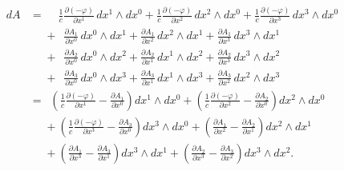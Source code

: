 \begin{align*}
	dA &= \phantom{+}
	\frac{1}{c} \frac{\partial (-\varphi)}{\partial x^1} \,dx^1 \wedge dx^0
	+ \frac{1}{c}\frac{\partial (-\varphi)}{\partial x^2} \,dx^2 \wedge dx^0
	+ \frac{1}{c}\frac{\partial (-\varphi)}{\partial x^3} \,dx^3 \wedge dx^0
	\\
	&\phantom{=}+ \phantom{\frac{1}{c}} \frac{\partial A_1}{\partial x^0} \,dx^0 \wedge dx^1
	+ \frac{\partial A_1}{\partial x^2} \,dx^2 \wedge dx^1
	+ \frac{\partial A_1}{\partial x^3} \,dx^3 \wedge dx^1
	\\
	&\phantom{=}+ \phantom{\frac{1}{c}} \frac{\partial A_2}{\partial x^0} \,dx^0 \wedge dx^2
	+ \frac{\partial A_2}{\partial x^1} \,dx^1 \wedge dx^2
	+ \frac{\partial A_2}{\partial x^3} \,dx^3 \wedge dx^2
	\\
	&\phantom{=}+ \phantom{\frac{1}{c}} \frac{\partial A_3}{\partial x^0} \,dx^0 \wedge dx^3
	+ \frac{\partial A_3}{\partial x^1} \,dx^1 \wedge dx^3
	+ \frac{\partial A_3}{\partial x^2} \,dx^2 \wedge dx^3
	\\[2ex] 
	&=
	\,\,\, \left(\frac{1}{c}\frac{\partial (-\varphi)}{\partial x^1}-\frac{\partial A_1}{\partial x^0}\right) dx^1 \wedge dx^0 
	+ \left(\frac{1}{c}\frac{\partial (-\varphi)}{\partial x^2}-\frac{\partial A_2}{\partial x^0}\right) dx^2 \wedge dx^0
	\\
	&\phantom{=} + \left(\frac{1}{c}\frac{\partial (-\varphi)}{\partial x^3}-\frac{\partial A_3}{\partial x^0}\right) dx^3 \wedge dx^0
	+ \left(\frac{\partial A_1}{\partial x^2}-\frac{\partial A_2}{\partial x^1}\right) dx^2 \wedge dx^1
	\\
	&\phantom{=} + \left(\frac{\partial A_1}{\partial x^3}-\frac{\partial A_3}{\partial x^1}\right) dx^3 \wedge dx^1 
	+ \left(\frac{\partial A_2}{\partial x^3}-\frac{\partial A_3}{\partial x^2}\right) dx^3 \wedge dx^2.				
\end{align*}

